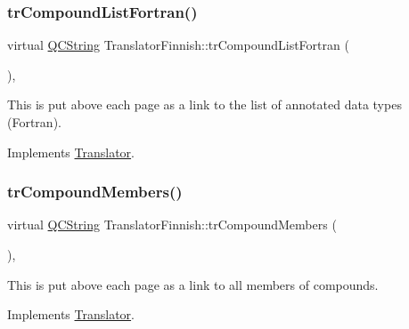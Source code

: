 \mbox{\label{class_translator_finnish_a25e23486ee2585b3394e526653aaf2fa}} 
\subsubsection{\texorpdfstring{trCompoundListFortran()}{trCompoundListFortran()}}
{\footnotesize\ttfamily virtual \mbox{\hyperlink{class_q_c_string}{Q\+C\+String}} Translator\+Finnish\+::tr\+Compound\+List\+Fortran (\begin{DoxyParamCaption}{ }\end{DoxyParamCaption})\hspace{0.3cm}{\ttfamily [inline]}, {\ttfamily [virtual]}}

This is put above each page as a link to the list of annotated data types (Fortran). 

Implements \mbox{\hyperlink{class_translator}{Translator}}.

\mbox{\label{class_translator_finnish_a38e8a8b11fa561ddb45f4ced27d5d04e}} 
\subsubsection{\texorpdfstring{trCompoundMembers()}{trCompoundMembers()}}
{\footnotesize\ttfamily virtual \mbox{\hyperlink{class_q_c_string}{Q\+C\+String}} Translator\+Finnish\+::tr\+Compound\+Members (\begin{DoxyParamCaption}{ }\end{DoxyParamCaption})\hspace{0.3cm}{\ttfamily [inline]}, {\ttfamily [virtual]}}

This is put above each page as a link to all members of compounds. 

Implements \mbox{\hyperlink{class_translator}{Translator}}.

\mbox{\label{class_translator_finnish_afe2f710c712dee2dfb73f651dc9aeb50}} 
